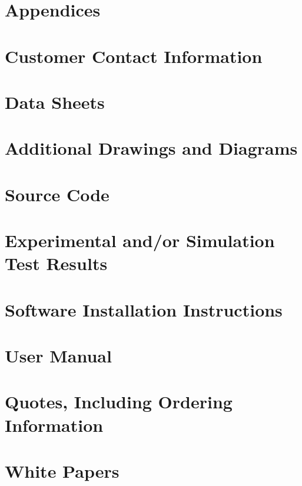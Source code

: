 \documentclass{article}
\begin{document}

\newpage
\section*{Appendices} %
\appendix
\section{Customer Contact Information}
\section{Data Sheets}
\section{Additional Drawings and Diagrams}
\section{Source Code} 
\section{Experimental and/or Simulation Test Results} 
\section{Software Installation Instructions} 
\section{User Manual} 
\section{Quotes, Including Ordering Information} 
\section{White Papers} 
\end{document}
